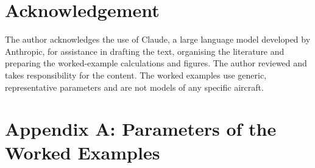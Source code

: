 \documentclass[10pt,a4paper,twocolumn]{article}
\begin{document}
\hypertarget{acknowledgement}{%
\section*{Acknowledgement}\label{acknowledgement}}

The author acknowledges the use of Claude, a large language model
developed by Anthropic, for assistance in drafting the text, organising
the literature and preparing the worked-example calculations and
figures. The author reviewed and takes responsibility for the content.
The worked examples use generic, representative parameters and are not
models of any specific aircraft.

\hypertarget{appendix-a-parameters-of-the-worked-examples}{%
\section*{Appendix A: Parameters of the Worked
Examples}\label{appendix-a-parameters-of-the-worked-examples}}
\end{document}
